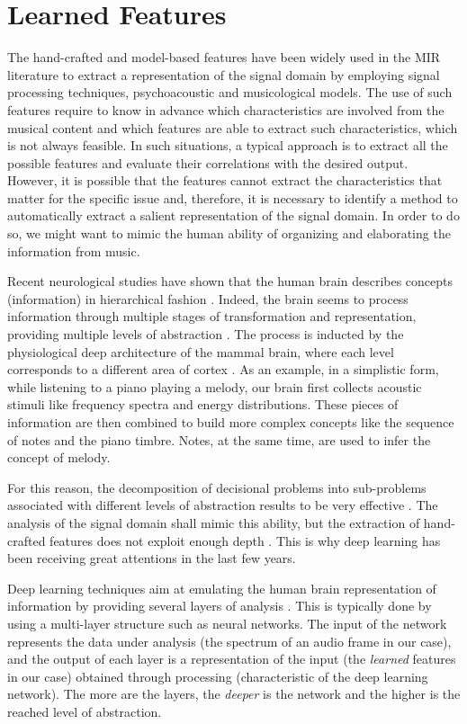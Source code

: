 \section{Learned Features}\label{sec:LLFs:learned}
The hand-crafted and model-based features have been widely used in the MIR literature to extract a representation of the signal domain by employing signal processing techniques, psychoacoustic and musicological models. The use of such features require to know in advance which characteristics are involved from the musical content and which features are able to extract such characteristics, which is not always feasible. In such situations, a typical approach is to extract all the possible features and evaluate their correlations with the desired output. However, it is possible that the features cannot extract the characteristics that matter for the specific issue and, therefore, it is necessary to identify a method to automatically extract a salient representation of the signal domain. In order to do so, we might want to mimic the human ability of organizing and elaborating the information from music.

Recent neurological studies have shown that the human brain describes concepts (information) in hierarchical fashion \cite{Serre2007}. Indeed, the brain seems to process information through multiple stages of transformation and representation, providing multiple levels of abstraction \cite{Haykin1998}. The process is inducted by the physiological deep architecture of the mammal brain, where each level corresponds to a different area of cortex \cite{Serre2007}. As an example, in a simplistic form, while listening to a piano playing a melody, our brain first collects acoustic stimuli like frequency spectra and energy distributions. These pieces of information are then combined to build more complex concepts like the sequence of notes and the piano timbre. Notes, at the same time, are used to infer the concept of melody.

For this reason, the decomposition of decisional problems into sub-problems associated with different levels of abstraction results to be very effective \cite{Humphrey2013}. The analysis of the signal domain shall mimic this ability, but the extraction of hand-crafted features does not exploit enough depth \cite{Bengio2009}. This is why deep learning has been receiving great attentions in the last few years.

Deep learning techniques aim at emulating the human brain representation of information by providing several layers of analysis \cite{Bengio2009}. This is typically done by using a multi-layer structure such as neural networks. The input of the network represents the data under analysis (the spectrum of an audio frame in our case), and the output of each layer is a representation of the input (the \textit{learned} features in our case) obtained through processing (characteristic of the deep learning network). The more are the layers, the \textit{deeper} is the network and the higher is the reached level of abstraction.


